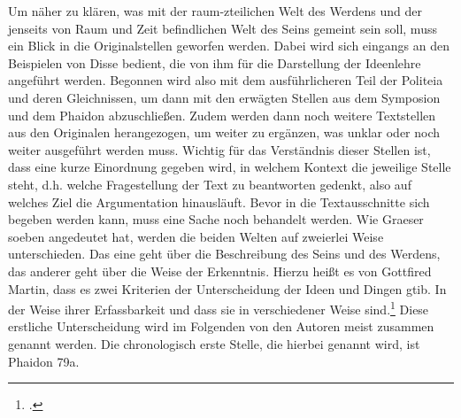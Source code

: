 Um näher zu klären, was mit der raum-zteilichen Welt des Werdens und der jenseits von Raum und Zeit befindlichen Welt des Seins gemeint sein soll, muss ein Blick in die Originalstellen geworfen werden. Dabei wird sich eingangs an den Beispielen von Disse bedient, die von ihm für die Darstellung der Ideenlehre angeführt werden. Begonnen wird also mit dem ausführlicheren Teil der Politeia und deren Gleichnissen, um dann mit den erwägten Stellen aus dem Symposion und dem Phaidon abzuschließen. Zudem werden dann noch weitere Textstellen aus den Originalen herangezogen, um weiter zu ergänzen, was unklar oder noch weiter ausgeführt werden muss. Wichtig für das Verständnis dieser Stellen ist, dass eine kurze Einordnung gegeben wird, in welchem Kontext die jeweilige Stelle steht, d.h. welche Fragestellung der Text zu beantworten gedenkt, also auf welches Ziel die Argumentation hinausläuft.
Bevor in die Textausschnitte sich begeben werden kann, muss eine Sache noch behandelt werden. Wie Graeser soeben angedeutet hat, werden die beiden Welten auf zweierlei Weise unterschieden. Das eine geht über die Beschreibung des Seins und des Werdens, das anderer geht über die Weise der Erkenntnis. Hierzu heißt es von Gottfired Martin, dass es zwei Kriterien der Unterscheidung der Ideen und Dingen gtib. In der Weise ihrer Erfassbarkeit und dass sie in verschiedener Weise sind.\footcite[vgl.][S. 40]{Martin73}
Diese erstliche Unterscheidung wird im Folgenden von den Autoren meist zusammen genannt werden. Die chronologisch erste Stelle, die hierbei genannt wird, ist Phaidon 79a.
